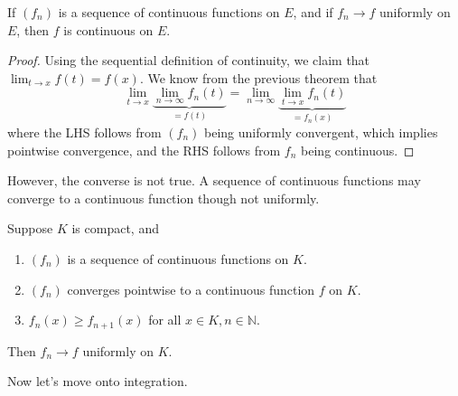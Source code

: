   \begin{corollary}
    If $(f_n)$ is a sequence of continuous functions on $E$, and if $f_n \to f$ uniformly on $E$, then $f$ is continuous on $E$. 
  \end{corollary}
  \begin{proof}
    Using the sequential definition of continuity, we claim that $\lim_{t \to x} f(t) = f(x)$. We know from the previous theorem that 
    \begin{equation}
      \lim_{t \to x} \underbrace{\lim_{n \to \infty} f_n (t)}_{= f(t)} = \lim_{n \to \infty} \underbrace{\lim_{t \to x} f_n (t)}_{= f_n (x)}
    \end{equation}
    where the LHS follows from $(f_n)$ being uniformly convergent, which implies pointwise convergence, and the RHS follows from $f_n$ being continuous.  
  \end{proof} 

  However, the converse is not true. A sequence of continuous functions may converge to a continuous function though not uniformly. 

  \begin{theorem}
    Suppose $K$ is compact, and 
    \begin{enumerate}
      \item $(f_n)$ is a sequence of continuous functions on $K$. 
      \item $(f_n)$ converges pointwise to a continuous function $f$ on $K$. 
      \item $f_n (x) \geq f_{n+1} (x)$ for all $x \in K, n \in \mathbb{N}$. 
    \end{enumerate}
    Then $f_n \to f$ uniformly on $K$. 
  \end{theorem} 

  Now let's move onto integration. 

